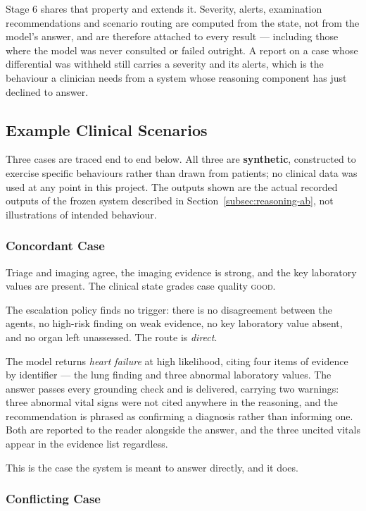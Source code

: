 Stage 6 shares that property and extends it. Severity, alerts, examination recommendations and
scenario routing are computed from the state, not from the model's answer, and are therefore
attached to every result --- including those where the model was never consulted or failed
outright. A report on a case whose differential was withheld still carries a severity and its
alerts, which is the behaviour a clinician needs from a system whose reasoning component has
just declined to answer.

\subsection{Example Clinical Scenarios}
\label{subsec:integration-scenarios}

Three cases are traced end to end below. All three are \textbf{synthetic}, constructed to
exercise specific behaviours rather than drawn from patients; no clinical data was used at any
point in this project. The outputs shown are the actual recorded outputs of the frozen system
described in Section~\ref{subsec:reasoning-ab}, not illustrations of intended behaviour.

\subsubsection{Concordant Case}

Triage and imaging agree, the imaging evidence is strong, and the key laboratory values are
present. The clinical state grades case quality \textsc{good}.

The escalation policy finds no trigger: there is no disagreement between the agents, no
high-risk finding on weak evidence, no key laboratory value absent, and no organ left
unassessed. The route is \emph{direct}.

The model returns \emph{heart failure} at high likelihood, citing four items of evidence by
identifier --- the lung finding and three abnormal laboratory values. The answer passes every
grounding check and is delivered, carrying two warnings: three abnormal vital signs were not
cited anywhere in the reasoning, and the recommendation is phrased as confirming a diagnosis
rather than informing one. Both are reported to the reader alongside the answer, and the three
uncited vitals appear in the evidence list regardless.

This is the case the system is meant to answer directly, and it does.

\subsubsection{Conflicting Case}

